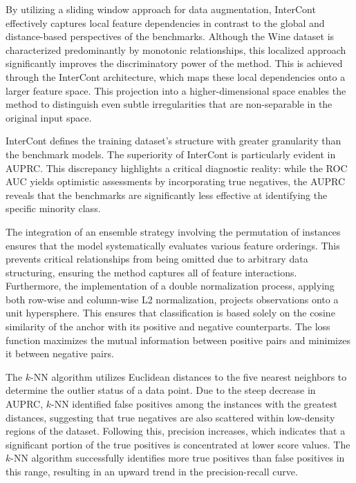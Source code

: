 By utilizing a sliding window approach for data augmentation, InterCont effectively captures local feature dependencies in contrast to the global and distance-based perspectives of the benchmarks. 
Although the Wine dataset is characterized predominantly by monotonic relationships, this localized approach significantly improves the discriminatory power of the method. 
This is achieved through the InterCont architecture, which maps these local dependencies onto a larger feature space. 
This projection into a higher-dimensional space enables the method to distinguish even subtle irregularities that are non-separable in the original input space.


InterCont defines the training dataset's structure with greater granularity than the benchmark models. 
The superiority of InterCont is particularly evident in AUPRC.
This discrepancy highlights a critical diagnostic reality: while the ROC AUC yields optimistic assessments by incorporating true negatives, the AUPRC reveals that the benchmarks are significantly less effective at identifying the specific minority class.


The integration of an ensemble strategy involving the permutation of instances ensures that the model systematically evaluates various feature orderings. 
This prevents critical relationships from being omitted due to arbitrary data structuring, ensuring the method captures all of feature interactions. 
Furthermore, the implementation of a double normalization process, applying both row-wise and column-wise L2 normalization, projects observations onto a unit hypersphere. 
This ensures that classification is based solely on the cosine similarity of the anchor with its positive and negative counterparts. 
The loss function maximizes the mutual information between positive pairs and minimizes it between negative pairs. 

 
The $k$-NN algorithm utilizes Euclidean distances to the five nearest neighbors to determine the outlier status of a data point. 
Due to the steep decrease in AUPRC, $k$-NN identified false positives among the instances with the greatest distances, suggesting that true negatives are also scattered within low-density regions of the dataset. 
Following this, precision increases, which indicates that a significant portion of the true positives is concentrated at lower score values. 
The $k$-NN algorithm successfully identifies more true positives than false positives in this range, resulting in an upward trend in the precision-recall curve.



